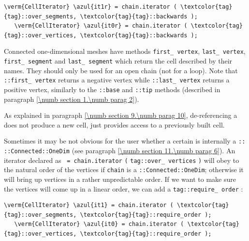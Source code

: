 \begin{Verbatim}[commandchars=\\\{\},formatcom=\small\tt,
   baselinestretch=0.94,framesep=2mm                      ]
   \verm{CellIterator} \azul{it1r} = chain.iterator ( \textcolor{tag}{tag}::over_segments, \textcolor{tag}{tag}::backwards );
   \verm{CellIterator} \azul{it0r} = chain.iterator ( \textcolor{tag}{tag}::over_vertices, \textcolor{tag}{tag}::backwards );
\end{Verbatim}

Connected one-dimensional meshes have methods {\small\tt first\_\,vertex},
{\small\tt last\_\,vertex}, {\small\tt first\_\,segment} and {\small\tt last\_\,segment}
which return the cell described by their names.
They should only be used for an open chain (not for a loop).
Note that {\small\tt {}::first\_\,vertex} returns a negative vertex while
{\small\tt {}::last\_\,vertex} returns a positive vertex, similarly to the
{\small\tt {}::base} and {\small\tt {}::tip} methods (described in paragraph
\ref{\numb section 1.\numb parag 2}).

As explained in paragraph \ref{\numb section 9.\numb parag 10},
de-referencing a {\small\tt {}} does not produce a new cell,
just provides access to a previously built cell.

Sometimes it may be not obvious for the user whether a certain {\small\tt {}}
is internally a {\small\tt {}:: ::Connected::OneDim}
(see paragraph \ref{\numb section 11.\numb parag 6}).
An iterator declared as {\small\tt {} = chain.iterator}\break
{\small\tt(} {\small\tt\textcolor{tag}{tag}::over\_\,vertices} {\small\tt)} will obey to
the natural order of the vertices if {\small\tt chain} is a\break
{\small\tt {}::Connected::OneDim}; otherwise it will bring up vertices
in a rather unpredictable order.
If we want to make sure the vertices will come up in a linear order, we can add a
{\small\tt \textcolor{tag}{tag}::require\_\,order} :

\begin{Verbatim}[commandchars=\\\{\},formatcom=\small\tt,
   baselinestretch=0.94,framesep=2mm                      ]
   \verm{CellIterator} \azul{it1} = chain.iterator ( \textcolor{tag}{tag}::over_segments, \textcolor{tag}{tag}::require_order );
   \verm{CellIterator} \azul{it0} = chain.iterator ( \textcolor{tag}{tag}::over_vertices, \textcolor{tag}{tag}::require_order );
\end{Verbatim}

